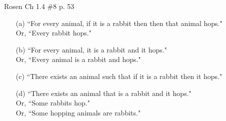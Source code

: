 \begin{questions}
 Rosen Ch 1.4 \#8  p. 53 
    \ifprintanswers
        \vspace{-12pt}
    \fi
  \begin{solution}
      \begin{itemize}[itemsep=0pt,parsep=0pt,topsep=0pt,partopsep=0pt]
         \item[(a)] ``For every animal, if it is a rabbit then then that animal hops."  \\Or, ``Every rabbit hops."
          \item[(b)] ``For every animal, it is a rabbit and it hops." \\Or, ``Every animal is a rabbit and hops."
          \item[(c)] ``There exists an animal such that if it is a rabbit then it hops."
          \item[(d)] ``There exists an animal that is a rabbit and it hops." \\Or, ``Some rabbits hop." \\Or, ``Some hopping animals are rabbits."
      \end{itemize}
  \end{solution}



\end{questions}
